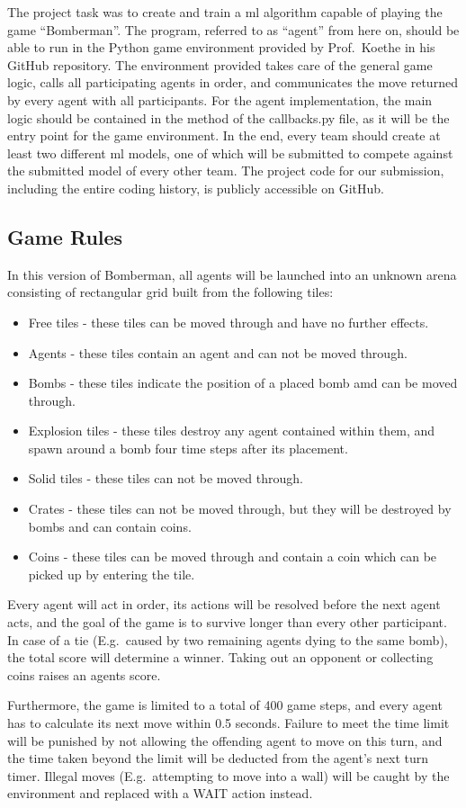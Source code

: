 The project task was to create and train a \gls{ml} algorithm capable of playing the game \enquote{Bomberman}.
The program, referred to as \enquote{agent} from here on, should be able to run in the Python game environment provided
by Prof.~Koethe in his GitHub repository\cite{githubbase}.
The environment provided takes care of the general game logic, calls all participating agents in order, and communicates
the move returned by every agent with all participants.
For the agent implementation, the main logic should be contained in the  method of the callbacks.py
file, as it will be the entry point for the game environment.
In the end, every team should create at least two different \gls{ml} models, one of which will be submitted to compete
against the submitted model of every other team.
The project code for our submission, including the entire coding history, is publicly accessible on
GitHub\cite{githubown}.

\subsection{Game Rules}
\label{subsec:rules}
In this version of Bomberman, all agents will be launched into an unknown arena consisting of rectangular grid built
from the following tiles:
\begin{itemize}
  \item Free tiles - these tiles can be moved through and have no further effects.
  \item Agents - these tiles contain an agent and can not be moved through.
  \item Bombs - these tiles indicate the position of a placed bomb amd can be moved through.
  \item Explosion tiles - these tiles destroy any agent contained within them, and spawn around a bomb four time steps
after its placement.
  \item Solid tiles - these tiles can not be moved through.
  \item Crates - these tiles can not be moved through, but they will be destroyed by bombs and can contain coins.
  \item Coins - these tiles can be moved through and contain a coin which can be picked up by entering the tile.
\end{itemize}

Every agent will act in order, its actions will be resolved before the next agent acts, and the goal of the game is to
survive longer than every other participant.
In case of a tie (E.g.~caused by two remaining agents dying to the same bomb), the total score will determine a winner.
Taking out an opponent or collecting coins raises an agents score.

Furthermore, the game is limited to a total of 400 game steps, and every agent has to calculate its next move within
0.5 seconds.
Failure to meet the time limit will be punished by not allowing the offending agent to move on this turn, and the time
taken beyond the limit will be deducted from the agent's next turn timer.
Illegal moves (E.g.~attempting to move into a wall) will be caught by the environment and replaced with a WAIT action
instead.

